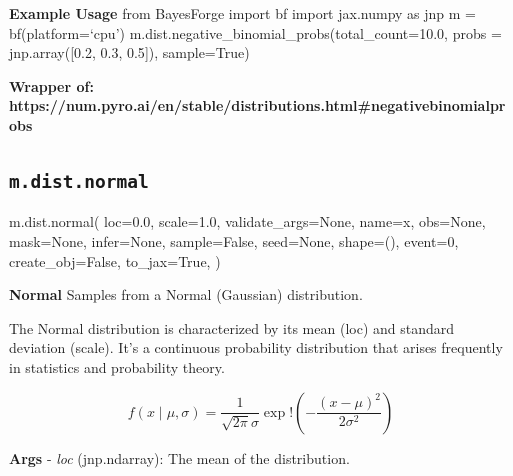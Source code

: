 \documentclass[
  letterpaper,
  DIV=11,
  numbers=noendperiod]{scrartcl}
\newenvironment{Shaded}{\begin{snugshade}}{\end{snugshade}}
\newcommand{\DecValTok}[1]{\textcolor[rgb]{0.68,0.00,0.00}{#1}}
\newcommand{\FloatTok}[1]{\textcolor[rgb]{0.68,0.00,0.00}{#1}}
\newcommand{\NormalTok}[1]{\textcolor[rgb]{0.00,0.23,0.31}{#1}}
\newcommand{\OperatorTok}[1]{\textcolor[rgb]{0.37,0.37,0.37}{#1}}
\newcommand{\StringTok}[1]{\textcolor[rgb]{0.13,0.47,0.30}{#1}}
\newcommand{\VariableTok}[1]{\textcolor[rgb]{0.07,0.07,0.07}{#1}}
\begin{document}
\textbf{Example Usage} from BayesForge import bf import jax.numpy as jnp
m = bf(platform=`cpu')
m.dist.negative\_binomial\_probs(total\_count=10.0, probs =
jnp.array({[}0.2, 0.3, 0.5{]}), sample=True)

\textbf{Wrapper of:
https://num.pyro.ai/en/stable/distributions.html\#negativebinomialprobs}

\subsection{\texorpdfstring{\texttt{m.dist.normal}}{m.dist.normal}}\label{normal}

\begin{Shaded}
\begin{Highlighting}[]
\NormalTok{m.dist.normal(}
\NormalTok{    loc}\OperatorTok{=}\FloatTok{0.0}\NormalTok{,}
\NormalTok{    scale}\OperatorTok{=}\FloatTok{1.0}\NormalTok{,}
\NormalTok{    validate\_args}\OperatorTok{=}\VariableTok{None}\NormalTok{,}
\NormalTok{    name}\OperatorTok{=}\StringTok{\textquotesingle{}x\textquotesingle{}}\NormalTok{,}
\NormalTok{    obs}\OperatorTok{=}\VariableTok{None}\NormalTok{,}
\NormalTok{    mask}\OperatorTok{=}\VariableTok{None}\NormalTok{,}
\NormalTok{    infer}\OperatorTok{=}\VariableTok{None}\NormalTok{,}
\NormalTok{    sample}\OperatorTok{=}\VariableTok{False}\NormalTok{,}
\NormalTok{    seed}\OperatorTok{=}\VariableTok{None}\NormalTok{,}
\NormalTok{    shape}\OperatorTok{=}\NormalTok{(),}
\NormalTok{    event}\OperatorTok{=}\DecValTok{0}\NormalTok{,}
\NormalTok{    create\_obj}\OperatorTok{=}\VariableTok{False}\NormalTok{,}
\NormalTok{    to\_jax}\OperatorTok{=}\VariableTok{True}\NormalTok{,}
\NormalTok{)}
\end{Highlighting}
\end{Shaded}

\textbf{Normal} Samples from a Normal (Gaussian) distribution.

The Normal distribution is characterized by its mean (loc) and standard
deviation (scale). It's a continuous probability distribution that
arises frequently in statistics and probability theory.

\[   
  f(x \mid \mu, \sigma) = \frac{1}{\sqrt{2\pi}\sigma}\exp!\left(-\frac{(x - \mu)^2}{2\sigma^2}\right)
  \]

\textbf{Args} - \emph{loc} (jnp.ndarray): The mean of the distribution.
\end{document}
